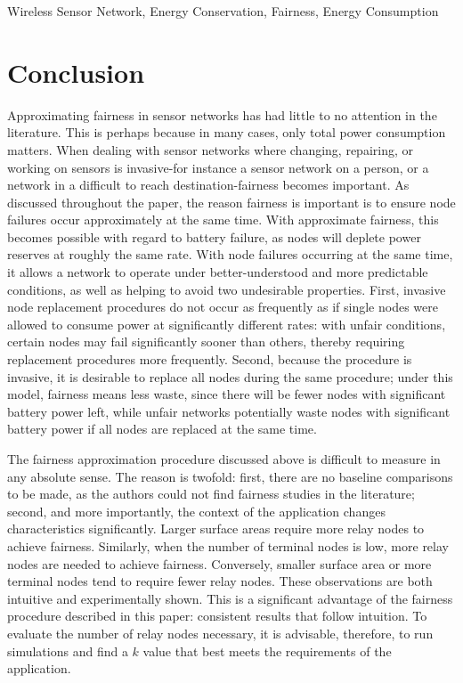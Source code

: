 \documentclass[11pt,conference]{IEEEtran}
\begin{document}
\begin{keywords}
Wireless Sensor Network, Energy Conservation, Fairness, Energy Consumption
\end{keywords}

\IEEEpeerreviewmaketitle










\section{Conclusion}\label{conclusion}

Approximating fairness in sensor networks has had little to no attention in the literature.  This is perhaps because in many cases, only total power consumption matters.  When dealing with sensor networks where changing, repairing, or working on sensors is invasive-for instance a sensor network on a person, or a network in a difficult to reach destination-fairness becomes important.  As discussed throughout the paper, the reason fairness is important is to ensure node failures occur approximately at the same time.  With approximate fairness, this becomes possible with regard to battery failure, as nodes will deplete power reserves at roughly the same rate.  With node failures occurring at the same time, it allows a network to operate under better-understood and more predictable conditions, as well as helping to avoid two undesirable properties.  First, invasive node replacement procedures do not occur as frequently as if single nodes were allowed to consume power at significantly different rates: with unfair conditions, certain nodes may fail significantly sooner than others, thereby requiring replacement procedures more frequently.  Second, because the procedure is invasive, it is desirable to replace all nodes during the same procedure; under this model, fairness means less waste, since there will be fewer nodes with significant battery power left, while unfair networks potentially waste nodes with significant battery power if all nodes are replaced at the same time.

The fairness approximation procedure discussed above is difficult to measure in any absolute sense.  The reason is twofold: first, there are no baseline comparisons to be made, as the authors could not find fairness studies in the literature; second, and more importantly, the context of the application changes characteristics significantly.  Larger surface areas require more relay nodes to achieve fairness.  Similarly, when the number of terminal nodes is low, more relay nodes are needed to achieve fairness.  Conversely, smaller surface area or more terminal nodes tend to require fewer relay nodes.  These observations are both intuitive and experimentally shown.  This is a significant advantage of the fairness procedure described in this paper: consistent results that follow intuition.  To evaluate the number of relay nodes necessary, it is advisable, therefore, to run simulations and find a $k$ value that best meets the requirements of the application.
\end{document}
